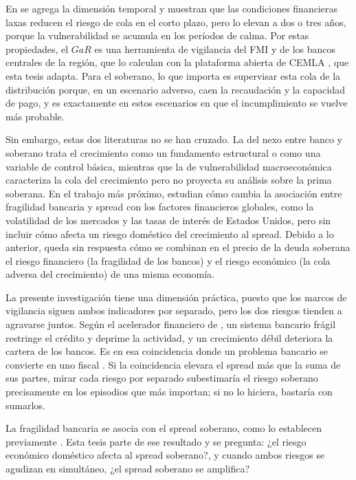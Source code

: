 En \citet{AdrianEtAl2022} se agrega la dimensión temporal y muestran que las condiciones financieras
laxas reducen el riesgo de cola en el corto plazo, pero lo elevan a dos o tres años, porque la
vulnerabilidad se acumula en los períodos de calma. Por estas propiedades, el $GaR$ es una herramienta
de vigilancia del FMI \citep{PrasadEtAl2019} y de los bancos centrales de la región, que lo calculan
con la plataforma abierta de CEMLA \citep{OssandonBusch2022}, que esta tesis adapta. Para el soberano,
lo que importa es supervisar esta cola de la distribución porque, en un escenario adverso, caen la
recaudación y la capacidad de pago, y es exactamente en estos escenarios en que el incumplimiento se
vuelve más probable.

Sin embargo, estas dos literaturas no se han cruzado. La del nexo entre banco y soberano trata el
crecimiento como un fundamento estructural o como una variable de control básica, mientras que la de
vulnerabilidad macroeconómica caracteriza la cola del crecimiento pero no proyecta su análisis sobre
la prima soberana. En el trabajo más próximo, \citet{Chari2024b} estudian cómo cambia la asociación
entre fragilidad bancaria y spread con los factores financieros globales, como la volatilidad de los
mercados y las tasas de interés de Estados Unidos, pero sin incluir cómo afecta un riesgo doméstico
del crecimiento al spread. Debido a lo anterior, queda sin respuesta cómo se combinan en el precio de
la deuda soberana el riesgo financiero (la fragilidad de los bancos) y el riesgo económico (la cola
adversa del crecimiento) de una misma economía.

La presente investigación tiene una dimensión práctica, puesto que los marcos de vigilancia siguen
ambos indicadores por separado, pero los dos riesgos tienden a agravarse juntos. Según el acelerador
financiero de \citet{BernankeGertlerGilchrist1996}, un sistema bancario frágil restringe el crédito y
deprime la actividad, y un crecimiento débil deteriora la cartera de los bancos. Es en esa coincidencia
donde un problema bancario se convierte en uno fiscal \citep{LaevenValencia2013}. Si la coincidencia
elevara el spread más que la suma de sus partes, mirar cada riesgo por separado subestimaría el riesgo
soberano precisamente en los episodios que más importan; si no lo hiciera, bastaría con sumarlos.

La fragilidad bancaria se asocia con el spread soberano, como lo establecen previamente
\citet{Chari2024b}. Esta tesis parte de ese resultado y se pregunta: ¿el riesgo económico doméstico
afecta al spread soberano?, y cuando ambos riesgos se agudizan en simultáneo, ¿el spread soberano se
amplifica?

